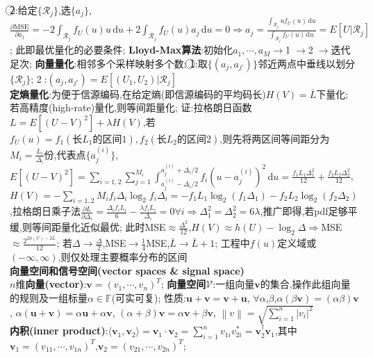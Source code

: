 \documentclass[UTF8,a4paper,10pt]{article}
\providecommand{\abs}[1]{\left\lvert#1\right\rvert}
\providecommand{\norm}[1]{\left\lVert#1\right\rVert}
\begin{document}
\begin{multicols*}{2}
    \textcircled{2}:给定$\{\mathcal{R}_j\}$,选$\{a_j\}$,$\frac{\partial\text{MSE}}{\partial a_j}=-2\int_{\mathcal{R}_j}f_U(u)u\,\mathrm{d}u+2\int_{\mathcal{R}_j}f_U(u)a_j\,\mathrm{d}u=0\Rightarrow a_j=\frac{\int_{\mathcal{R}_j}uf_U(u)\,\mathrm{d}u}{\int_{\mathcal{R}_j}f_U(u)\,\mathrm{d}u}=E[U\vert\mathcal{R}_j]$;%
    此即最优量化的必要条件;%
    \textbf{Lloyd-Max算法}:初始化$a_1,\cdots,a_M\rightarrow$\textcircled{1}$\rightarrow$\textcircled{2}$\rightarrow$迭代足次;%
    \textbf{向量量化}:相邻多个采样映射多个数;%
    \textcircled{1}:取$\{(a_j,a_{j'})\}$邻近两点中垂线以划分$\{\mathcal{R}_j\}$;%
    \textcircled{2}:$(a_j,a_{j'})=E[(U_1,U_2)\vert\mathcal{R}_j]$\\
\textbf{定熵量化}:为便于信源编码,在给定熵(即信源编码的平均码长)$H(V)=\bar{L}$下量化;%
    若高精度(high-rate)量化,则等间距量化;%
    证:拉格朗日函数$L=E[(U-V)^2]+\lambda H(V)$,若$f_U(u)=f_1(\text{长}L_1\text{的区间}1),f_2(\text{长}L_2\text{的区间}2)$,则先将两区间等间距分为$M_i=\frac{L_i}{\Delta_i}$份,代表点$\{a_j^{(i)}\}$,$E[(U-V)^2]=\sum_{i=1,2}\sum_{j=1}^{M_i}\int_{a_j^{(i)}-\Delta_i/2}^{a_j^{(i)}+\Delta_i/2}f_i(u-a_j^{(i)})^2\,\mathrm{d}u=\frac{f_1L_1\Delta_1^2}{12}+\frac{f_2L_2\Delta_2^2}{12}$,$H(V)=-\sum_{i=1,2}M_if_i\Delta_i\log_2 f_i\Delta_i=-f_1L_1\log_2(f_1\Delta_1)-f_2L_2\log_2(f_2\Delta_2)$,拉格朗日乘子法$\frac{\partial L}{\partial\Delta_i}=\frac{\Delta_if_iL_i}{6}-\frac{\lambda f_iL_i}{\Delta_i}=0\forall i\Rightarrow\Delta_1^2=\Delta_2^2=6\lambda$,推广即得,若pdf足够平缓,则等间距量化近似最优;%
    此时MSE$\approx\frac{\Delta^2}{12}$,$H(V)\approx h(U)-\log_2\Delta\Rightarrow$MSE$\approx\frac{2^{2h(U)-2\bar{L}}}{12}$;%
    若$\Delta\rightarrow\frac{\Delta}{2}$,MSE$\rightarrow\frac{1}{4}$MSE,$\bar{L}\rightarrow\bar{L}+1$;%
    工程中$f(u)$定义域或$(-\infty,\infty)$,则仅处理主要概率分布的区间\\
\textbf{向量空间和信号空间(vector spaces \& signal space)}\hrulefill\\
$n$维\textbf{向量(vector)}:$\bm{v}=(v_1,\cdots,v_n)^T$;%
    \textbf{向量空间}$\mathcal{V}$:一组向量$\bm{v}$的集合,操作此组向量的规则及一组标量$\alpha\in\mathbb{F}$(可实可复);%
    性质:$\bm{u}+\bm{v}=\bm{v}+\bm{u}$,%
    $\forall\alpha$,$\beta$,$\alpha(\beta\bm{v})=(\alpha\beta)\bm{v}$,%
    $\alpha(\bm{u}+\bm{v})=\alpha\bm{u}+\alpha\bm{v}$,%
    $(\alpha+\beta)\bm{v}=\alpha\bm{v}+\beta\bm{v}$,%
    $\norm{v}=\sqrt{\sum_{i=1}^n\abs{v_i}^2}$\\
\textbf{内积(inner product)}:$\langle\bm{v}_1,\bm{v}_2\rangle=\bm{v}_1\cdot\bm{v}_2=\sum_{i=1}^nv_{1i}v_{2i}^*=\bm{v}_2^{\dagger}\bm{v}_1$,其中$\bm{v}_1=(v_{11},\cdots,v_{1n})^T$,$\bm{v}_2=(v_{21},\cdots,v_{2n})^T$;%

\end{multicols*}
\end{document}
